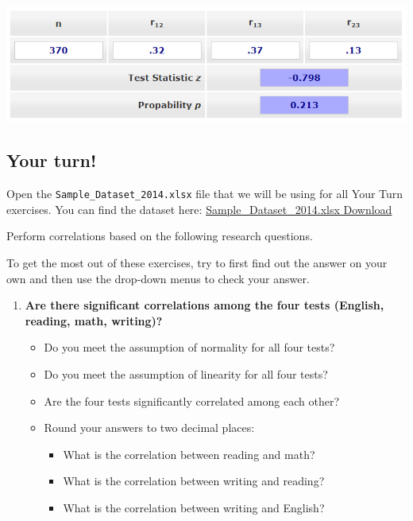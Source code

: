 \documentclass[
]{book}
\begin{document}
\includegraphics{images/08-correlation/compare-correlations-dependent.png}

\hypertarget{your-turn-8}{%
\subsection{Your turn!}\label{your-turn-8}}

Open the \texttt{Sample\_Dataset\_2014.xlsx} file that we will be using for all Your Turn exercises. You can find the dataset here: \href{https://github.com/danawanzer/stats-with-jamovi/blob/master/data/Sample_Dataset_2014.xlsx}{Sample\_Dataset\_2014.xlsx Download}

Perform correlations based on the following research questions.

To get the most out of these exercises, try to first find out the answer on your own and then use the drop-down menus to check your answer.

\begin{enumerate}
\def\labelenumi{\arabic{enumi}.}
\item
  \textbf{Are there significant correlations among the four tests (English, reading, math, writing)?}

  \begin{itemize}
  \item
    Do you meet the assumption of normality for all four tests?
  \item
    Do you meet the assumption of linearity for all four tests?
  \item
    Are the four tests significantly correlated among each other?
  \item
    Round your answers to two decimal places:

    \begin{itemize}
    \item
      What is the correlation between reading and math?
    \item
      What is the correlation between writing and reading?
    \item
      What is the correlation between writing and English?
    \end{itemize}
  \end{itemize}
\end{enumerate}
\end{document}
